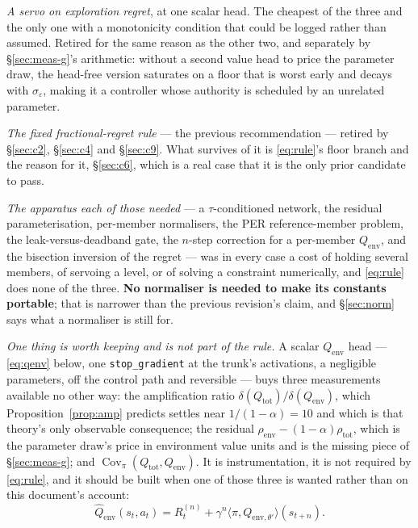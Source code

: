 \documentclass{article}
\DeclareMathOperator{\Cov}{Cov}
\newcommand{\env}{\mathrm{env}}
\newcommand{\tot}{\mathrm{tot}}
\newcommand{\gapop}{\delta}
\newcommand{\snoise}{\sigma_{\varepsilon}}
\newcommand{\ip}[2]{\langle #1, #2 \rangle}
\begin{document}
\emph{A servo on exploration regret}, at one scalar head. The cheapest of the three and the only
one with a monotonicity condition that could be logged rather than assumed. Retired for the same
reason as the other two, and separately by \S\ref{sec:meas-g}'s arithmetic: without a second value
head to price the parameter draw, the head-free version saturates on a floor that is worst early
and decays with $\snoise$, making it a controller whose authority is scheduled by an unrelated
parameter.

\emph{The fixed fractional-regret rule} --- the previous recommendation --- retired by
\S\ref{sec:c2}, \S\ref{sec:c4} and \S\ref{sec:c9}. What survives of it is \eqref{eq:rule}'s floor
branch and the reason for it, \S\ref{sec:c6}, which is a real case that it is the only prior
candidate to pass.

\emph{The apparatus each of those needed} --- a $\tau$-conditioned network, the residual
parameterisation, per-member normalisers, the PER reference-member problem, the
leak-versus-deadband gate, the $n$-step correction for a per-member $Q_\env$, and the
bisection inversion of the regret --- was in every case a cost of holding several members,
of servoing a level, or of solving a constraint numerically, and \eqref{eq:rule} does none of the
three. \textbf{No normaliser is needed to make its constants portable}; that is narrower than the
previous revision's claim, and \S\ref{sec:norm} says what a normaliser is still for.

\emph{One thing is worth keeping and is not part of the rule.} A scalar $Q_\env$ head ---
\eqref{eq:qenv} below, one \texttt{stop\_gradient} at the trunk's activations, a negligible
parameters, off the control path and reversible --- buys three measurements available no other
way: the amplification ratio $\gapop(Q_\tot)/\gapop(Q_\env)$, which
Proposition~\ref{prop:amp} predicts settles near $1/(1-\alpha) = 10$ and which is that theory's
only observable consequence; the residual $\rho_\env - (1-\alpha)\rho_\tot$, which is the
parameter draw's price in environment value units and is the missing piece of \S\ref{sec:meas-g};
and $\Cov_{\pi}(Q_\tot, Q_\env)$. It is instrumentation, it is not required by \eqref{eq:rule},
and it should be built when one of those three is wanted rather than on this document's account:
\begin{equation}
  \hat{Q}_\env(s_t,a_t) = R^{(n)}_t + \gamma^{n} \ip{\pi}{Q_{\env,\theta'}}(s_{t+n}).
  \label{eq:qenv}
\end{equation}
\end{document}
